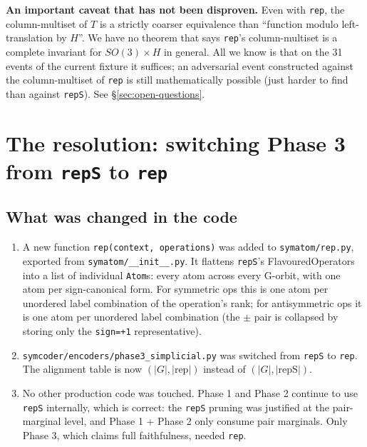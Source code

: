 \documentclass[a4paper,11pt]{article}
\begin{document}
\medskip
\noindent
\textbf{An important caveat that has not been disproven.}  Even with
\texttt{rep}, the column-multiset of $T$ is a strictly coarser
equivalence than ``function modulo left-translation by $H$''.  We have
no theorem that says \texttt{rep}'s column-multiset is a complete
invariant for $SO(3) \times H$ in general.  All we know is that on the
31 events of the current fixture it suffices; an adversarial event
constructed against the column-multiset of \texttt{rep} is still
mathematically possible (just harder to find than against
\texttt{repS}).  See \S\ref{sec:open-questions}.

\section{The resolution: switching Phase 3 from \texttt{repS} to \texttt{rep}}
\label{sec:resolution}

\subsection{What was changed in the code}

\begin{enumerate}[nosep]
  \item A new function \texttt{rep(context, operations)} was added to
        \texttt{symatom/rep.py}, exported from \texttt{symatom/\_\_init\_\_.py}.
        It flattens \texttt{repS}'s FlavouredOperators into a list of
        individual \texttt{Atom}s: every atom across every G-orbit, with
        one atom per sign-canonical form.  For symmetric ops this is one
        atom per unordered label combination of the operation's rank; for
        antisymmetric ops it is one atom per unordered label combination
        (the $\pm$ pair is collapsed by storing only the
        \texttt{sign=+1} representative).
  \item \texttt{symcoder/encoders/phase3\_simplicial.py} was switched
        from \texttt{repS} to \texttt{rep}.  The alignment table is now
        $(|G|, |\text{rep}|)$ instead of $(|G|, |\text{repS}|)$.
  \item No other production code was touched.  Phase 1 and Phase 2
        continue to use \texttt{repS} internally, which is correct:
        the \texttt{repS} pruning was justified at the pair-marginal
        level, and Phase 1 + Phase 2 only consume pair marginals.  Only
        Phase 3, which claims full faithfulness, needed \texttt{rep}.
\end{enumerate}
\end{document}
